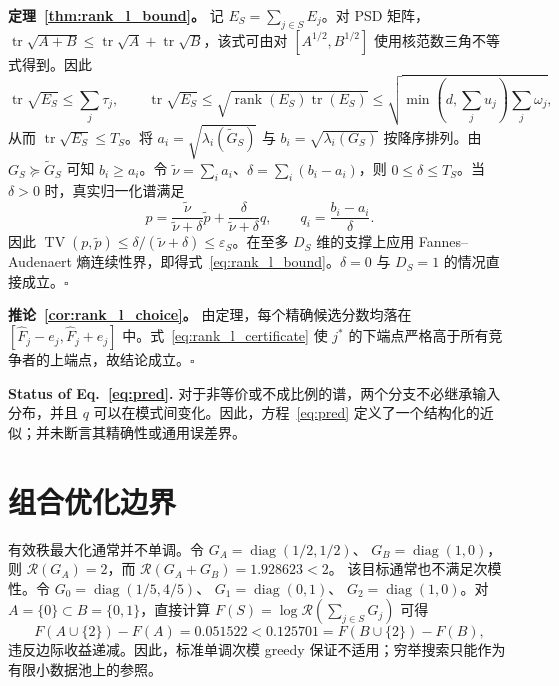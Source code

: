 \documentclass{article}
\begin{document}
\textbf{定理~\ref{thm:rank_l_bound}。}
记 $E_S=\sum_{j\in S}E_j$。对 PSD 矩阵，
$\operatorname{tr}\sqrt{A+B}\leq\operatorname{tr}\sqrt A+
\operatorname{tr}\sqrt B$，该式可由对
$[A^{1/2},B^{1/2}]$ 使用核范数三角不等式得到。因此
\begin{equation}
 \operatorname{tr}\sqrt{E_S}\leq\sum_j\tau_j,
 \qquad
 \operatorname{tr}\sqrt{E_S}
 \leq\sqrt{\operatorname{rank}(E_S)\operatorname{tr}(E_S)}
 \leq\sqrt{\min(d,\sum_j u_j)\sum_j\omega_j},
\end{equation}
从而 $\operatorname{tr}\sqrt{E_S}\leq T_S$。将
$a_i=\sqrt{\lambda_i(\widetilde G_S)}$ 与
$b_i=\sqrt{\lambda_i(G_S)}$ 按降序排列。由
$G_S\succeq\widetilde G_S$ 可知 $b_i\geq a_i$。令
$\widetilde\nu=\sum_i a_i$、$\delta=\sum_i(b_i-a_i)$，则
$0\leq\delta\leq T_S$。当 $\delta>0$ 时，真实归一化谱满足
\begin{equation}
 p=\frac{\widetilde\nu}{\widetilde\nu+\delta}\widetilde p
 +\frac{\delta}{\widetilde\nu+\delta}q,
 \qquad q_i=\frac{b_i-a_i}{\delta}.
\end{equation}
因此 $\operatorname{TV}(p,\widetilde p)\leq
\delta/(\widetilde\nu+\delta)\leq\varepsilon_S$。在至多 $D_S$ 维的支撑上应用 Fannes--Audenaert 熵连续性界，即得式~\eqref{eq:rank_l_bound}。$\delta=0$ 与 $D_S=1$ 的情况直接成立。$\square$

\textbf{推论~\ref{cor:rank_l_choice}。}
由定理，每个精确候选分数均落在
$[\widehat F_j-e_j,\widehat F_j+e_j]$ 中。式~\eqref{eq:rank_l_certificate} 使 $j^*$ 的下端点严格高于所有竞争者的上端点，故结论成立。$\square$

\textbf{Status of Eq.~\eqref{eq:pred}.}
对于非等价或不成比例的谱，两个分支不必继承输入分布，并且 $q$ 可以在模式间变化。因此，方程~\eqref{eq:pred} 定义了一个结构化的近似；并未断言其精确性或通用误差界。

\section{组合优化边界}
\label{app:optimization_limits}

有效秩最大化通常并不单调。令
$G_A=\operatorname{diag}(1/2,1/2)$、
$G_B=\operatorname{diag}(1,0)$，则
$\mathcal R(G_A)=2$，而
$\mathcal R(G_A+G_B)=1.928623<2$。
该目标通常也不满足次模性。令
$G_0=\operatorname{diag}(1/5,4/5)$、
$G_1=\operatorname{diag}(0,1)$、
$G_2=\operatorname{diag}(1,0)$。对
$A=\{0\}\subset B=\{0,1\}$，直接计算
$F(S)=\log\mathcal R(\sum_{j\in S}G_j)$ 可得
\begin{equation}
 F(A\cup\{2\})-F(A)=0.051522
 <0.125701=F(B\cup\{2\})-F(B),
\end{equation}
违反边际收益递减。因此，标准单调次模 greedy 保证不适用；穷举搜索只能作为有限小数据池上的参照。
\end{document}
